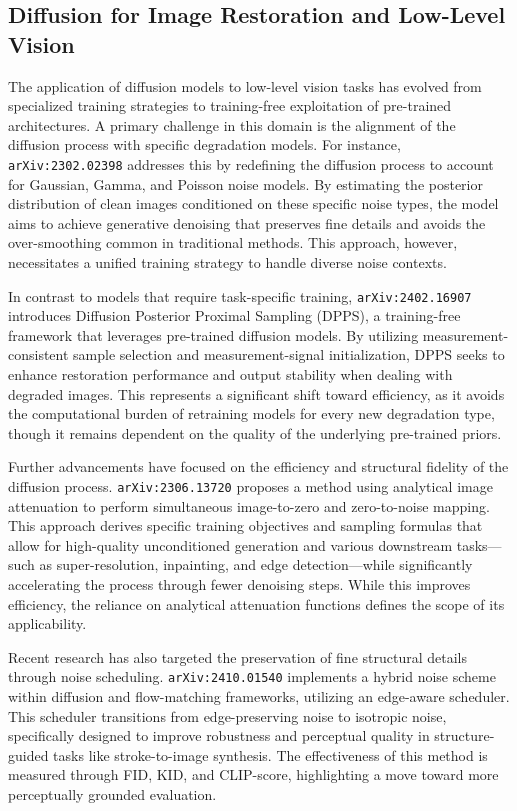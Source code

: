 \documentclass[11pt]{article}
\begin{document}
\subsection{Diffusion for Image Restoration and Low-Level Vision}

The application of diffusion models to low-level vision tasks has evolved from specialized training strategies to training-free exploitation of pre-trained architectures. A primary challenge in this domain is the alignment of the diffusion process with specific degradation models. For instance, \texttt{arXiv:2302.02398} addresses this by redefining the diffusion process to account for Gaussian, Gamma, and Poisson noise models. By estimating the posterior distribution of clean images conditioned on these specific noise types, the model aims to achieve generative denoising that preserves fine details and avoids the over-smoothing common in traditional methods. This approach, however, necessitates a unified training strategy to handle diverse noise contexts.

In contrast to models that require task-specific training, \texttt{arXiv:2402.16907} introduces Diffusion Posterior Proximal Sampling (DPPS), a training-free framework that leverages pre-trained diffusion models. By utilizing measurement-consistent sample selection and measurement-signal initialization, DPPS seeks to enhance restoration performance and output stability when dealing with degraded images. This represents a significant shift toward efficiency, as it avoids the computational burden of retraining models for every new degradation type, though it remains dependent on the quality of the underlying pre-trained priors.

Further advancements have focused on the efficiency and structural fidelity of the diffusion process. \texttt{arXiv:2306.13720} proposes a method using analytical image attenuation to perform simultaneous image-to-zero and zero-to-noise mapping. This approach derives specific training objectives and sampling formulas that allow for high-quality unconditioned generation and various downstream tasks—such as super-resolution, inpainting, and edge detection—while significantly accelerating the process through fewer denoising steps. While this improves efficiency, the reliance on analytical attenuation functions defines the scope of its applicability.

Recent research has also targeted the preservation of fine structural details through noise scheduling. \texttt{arXiv:2410.01540} implements a hybrid noise scheme within diffusion and flow-matching frameworks, utilizing an edge-aware scheduler. This scheduler transitions from edge-preserving noise to isotropic noise, specifically designed to improve robustness and perceptual quality in structure-guided tasks like stroke-to-image synthesis. The effectiveness of this method is measured through FID, KID, and CLIP-score, highlighting a move toward more perceptually grounded evaluation.
\end{document}
